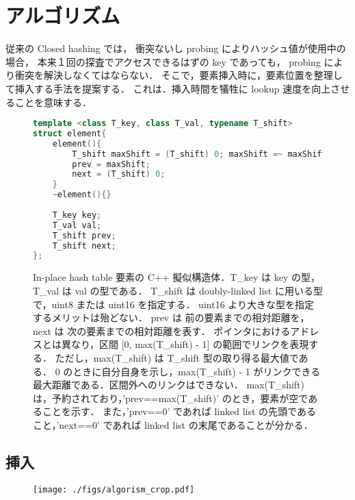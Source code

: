 \chapter{アルゴリズム}
\label{chap_Algorism}

従来の Closed hashing では，
衝突ないし probing によりハッシュ値が使用中の場合，
本来１回の探査でアクセスできるはずの key であっても，
probing により衝突を解決しなくてはならない．
そこで，要素挿入時に，要素位置を整理して挿入する手法を提案する．
これは．挿入時間を犠牲に lookup 速度を向上させることを意味する．



\begin{figure}[h] %
\begin{lstlisting}[language=C++]
template <class T_key, class T_val, typename T_shift>
struct element{
	element(){
		T_shift maxShift = (T_shift) 0; maxShift =~ maxShift;
		prev = maxShift;
		next = (T_shift) 0;
	}
	~element(){}
	
	T_key key;
	T_val val;
	T_shift prev;
	T_shift next;
};
\end{lstlisting}
\caption{
  In-place hash table 要素の C++ 擬似構造体．T\_key は key の型，T\_val は val の型である．
  T\_shift は doubly-linked list に用いる型で，uint8 または uint16 を指定する．
  uint16 より大きな型を指定するメリットは殆どない．
  prev は 前の要素までの相対距離を，next は 次の要素までの相対距離を表す．
  ポインタにおけるアドレスとは異なり，区間 [0, max(T\_shift) - 1] の範囲でリンクを表現する．
  ただし，max(T\_shift) は T\_shift 型の取り得る最大値である．
  0 のときに自分自身を示し，max(T\_shift) - 1 がリンクできる最大距離である．区間外へのリンクはできない．
  max(T\_shift) は，予約されており，'prev==max(T\_shift)' のとき，要素が空であることを示す．
  また，'prev==0' であれば linked list の先頭であること，'next==0' であれば linked list の末尾であることが分かる．
}
\label{fig_IpCHashT_struct}
\end{figure}



\section{挿入}

\begin{figure}[h]
\begin{center}
  \texttt{[image: ./figs/algorism\_crop.pdf]}
\end{center}
\end{figure}

